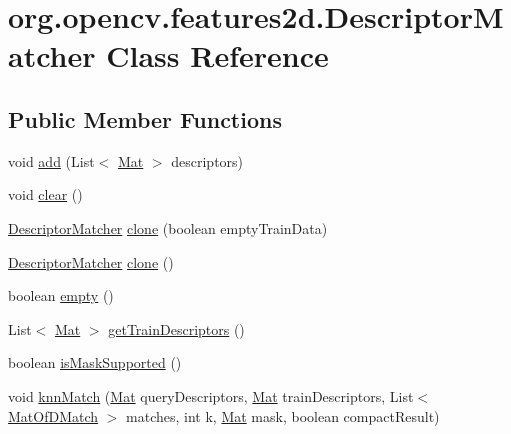 \hypertarget{classorg_1_1opencv_1_1features2d_1_1_descriptor_matcher}{}\section{org.\+opencv.\+features2d.\+Descriptor\+Matcher Class Reference}
\label{classorg_1_1opencv_1_1features2d_1_1_descriptor_matcher}
\subsection*{Public Member Functions}
\begin{DoxyCompactItemize}
\item 
void \mbox{\hyperlink{classorg_1_1opencv_1_1features2d_1_1_descriptor_matcher_aae08a476f7626406fb238bd32b28d1a3}{add}} (List$<$ \mbox{\hyperlink{classorg_1_1opencv_1_1core_1_1_mat}{Mat}} $>$ descriptors)
\item 
void \mbox{\hyperlink{classorg_1_1opencv_1_1features2d_1_1_descriptor_matcher_a1e843e5c3ff04bf99a5a3d5333da2115}{clear}} ()
\item 
\mbox{\hyperlink{classorg_1_1opencv_1_1features2d_1_1_descriptor_matcher}{Descriptor\+Matcher}} \mbox{\hyperlink{classorg_1_1opencv_1_1features2d_1_1_descriptor_matcher_aa7e081a62ed26d64d4700a4609b33253}{clone}} (boolean empty\+Train\+Data)
\item 
\mbox{\hyperlink{classorg_1_1opencv_1_1features2d_1_1_descriptor_matcher}{Descriptor\+Matcher}} \mbox{\hyperlink{classorg_1_1opencv_1_1features2d_1_1_descriptor_matcher_a4ff8536e8a907010eaacb98ebe996a24}{clone}} ()
\item 
boolean \mbox{\hyperlink{classorg_1_1opencv_1_1features2d_1_1_descriptor_matcher_a95a7d890bb409e13791a4f7702631e59}{empty}} ()
\item 
List$<$ \mbox{\hyperlink{classorg_1_1opencv_1_1core_1_1_mat}{Mat}} $>$ \mbox{\hyperlink{classorg_1_1opencv_1_1features2d_1_1_descriptor_matcher_aeb2d3f129adc9afcb18a318d8f9464ea}{get\+Train\+Descriptors}} ()
\item 
boolean \mbox{\hyperlink{classorg_1_1opencv_1_1features2d_1_1_descriptor_matcher_a33fddc130bf7d2458fcec231490322e2}{is\+Mask\+Supported}} ()
\item 
void \mbox{\hyperlink{classorg_1_1opencv_1_1features2d_1_1_descriptor_matcher_ac00ee4a90434accdd31bac8edbb3a39f}{knn\+Match}} (\mbox{\hyperlink{classorg_1_1opencv_1_1core_1_1_mat}{Mat}} query\+Descriptors, \mbox{\hyperlink{classorg_1_1opencv_1_1core_1_1_mat}{Mat}} train\+Descriptors, List$<$ \mbox{\hyperlink{classorg_1_1opencv_1_1core_1_1_mat_of_d_match}{Mat\+Of\+D\+Match}} $>$ matches, int k, \mbox{\hyperlink{classorg_1_1opencv_1_1core_1_1_mat}{Mat}} mask, boolean compact\+Result)

\end{DoxyCompactItemize}

